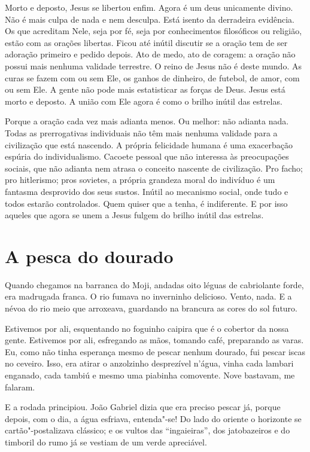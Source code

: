 Morto e deposto, Jesus se libertou enfim. Agora é um deus unicamente
divino. Não é mais culpa de nada e nem desculpa. Está isento da
derradeira evidência. Os que acreditam Nele, seja por fé, seja por
conhecimentos filosóficos ou religião, estão com as orações libertas.
Ficou até inútil discutir se a oração tem de ser adoração primeiro e
pedido depois. Ato de medo, ato de coragem: a oração não possui mais
nenhuma validade terrestre. O reino de Jesus não é deste mundo. As curas
se fazem com ou sem Ele, os ganhos de dinheiro, de futebol, de amor, com
ou sem Ele. A gente não pode mais estatisticar as forças de Deus. Jesus
está morto e deposto. A união com Ele agora é como o brilho inútil das
estrelas.

Porque a oração cada vez mais adianta menos. Ou melhor: não adianta
nada. Todas as prerrogativas individuais não têm mais nenhuma validade
para a civilização que está nascendo. A própria felicidade humana é uma
exacerbação espúria do individualismo. Cacoete pessoal que não interessa
às preocupações sociais, que não adianta nem atrasa o conceito nascente
de civilização. Pro facho; pro hitlerismo; pros sovietes, a própria
grandeza moral do indivíduo é um fantasma desprovido dos seus sustos.
Inútil ao mecanismo social, onde tudo e todos estarão controlados. Quem
quiser que a tenha, é indiferente. E por isso aqueles que agora se unem
a Jesus fulgem do brilho inútil das estrelas.

\chapter{A pesca do dourado}

Quando chegamos na barranca do Moji, andadas oito léguas de cabriolante
forde, era madrugada franca. O rio fumava no inverninho delicioso.
Vento, nada. E a névoa do rio meio que arroxeava, guardando na brancura
as cores do sol futuro.

Estivemos por ali, esquentando no foguinho caipira que é o cobertor da
nossa gente. Estivemos por ali, esfregando as mãos, tomando café,
preparando as varas. Eu, como não tinha esperança mesmo de pescar nenhum
dourado, fui pescar iscas no ceveiro. Isso, era atirar o anzolzinho
desprezível n'água, vinha cada lambari enganado, cada tambiú e mesmo uma
piabinha comovente. Nove bastavam, me falaram.

E a rodada principiou. João Gabriel dizia que era preciso pescar já,
porque depois, com o dia, a água esfriava, entenda"-se! Do lado do
oriente o horizonte se cartão"-postalizava clássico; e os vultos das
``ingaieiras'', dos jatobazeiros e do timboril do rumo já se vestiam de um
verde apreciável.


